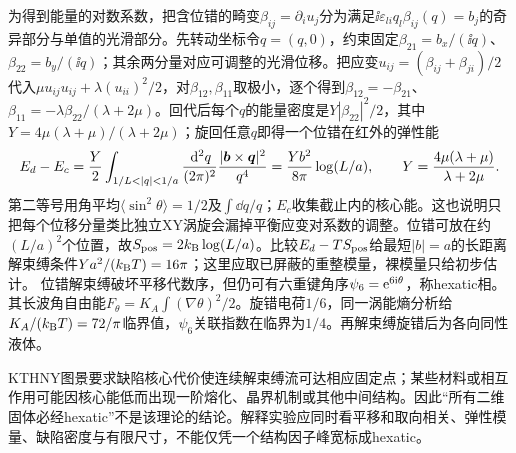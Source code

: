 为得到能量的对数系数，把含位错的畸变$\beta_{ij}=\partial_i u_j$分为满足$\ii\varepsilon_{li}q_l\beta_{ij}(q)=b_j$的奇异部分与单值的光滑部分。先转动坐标令$q=(q,0)$，约束固定$\beta_{21}=b_x/(\ii q)$、$\beta_{22}=b_y/(\ii q)$；其余两分量对应可调整的光滑位移。把应变$u_{ij}=(\beta_{ij}+\beta_{ji})/2$代入$\mu u_{ij}u_{ij}+\lambda(u_{ii})^2/2$，对$\beta_{12},\beta_{11}$取极小，逐个得到$\beta_{12}=-\beta_{21}$、$\beta_{11}=-\lambda\beta_{22}/(\lambda+2\mu)$。回代后每个$q$的能量密度是$Y|\beta_{22}|^2/2$，其中$Y=4\mu(\lambda+\mu)/(\lambda+2\mu)$；旋回任意$q$即得一个位错在红外的弹性能
\begin{equation}
E_d-E_c=\frac Y2\int_{1/L<|q|<1/a}\frac{\dd^2q}{(2\pi)^2}
\frac{|\vct b\times\vct q|^2}{q^4}
=\frac{Yb^2}{8\pi}\log(L/a),\qquad
Y=\frac{4\mu(\lambda+\mu)}{\lambda+2\mu}.
\end{equation}
第二等号用角平均$\langle\sin^2\theta\rangle=1/2$及$\int\dd q/q$；$E_c$收集截止内的核心能。这也说明只把每个位移分量类比独立XY涡旋会漏掉平衡应变对系数的调整。位错可放在约$(L/a)^2$个位置，故$S_{\rm pos}=2k_{\mathrm B}\log(L/a)$。比较$E_d-TS_{\rm pos}$给最短$|b|=a$的长距离解束缚条件$Ya^2/(k_{\mathrm B} T)=16\pi$；这里应取已屏蔽的重整模量，裸模量只给初步估计。
位错解束缚破坏平移代数序，但仍可有六重键角序$\psi_6=\mathrm e^{6\mathrm i\theta}$，称hexatic相。其长波角自由能$F_\theta=K_A\int(\nabla\theta)^2/2$。旋错电荷$1/6$，同一涡能熵分析给$K_A/(k_{\mathrm B} T)=72/\pi$临界值，$\psi_6$关联指数在临界为$1/4$。再解束缚旋错后为各向同性液体。

KTHNY图景要求缺陷核心代价使连续解束缚流可达相应固定点；某些材料或相互作用可能因核心能低而出现一阶熔化、晶界机制或其他中间结构。因此“所有二维固体必经hexatic”不是该理论的结论。解释实验应同时看平移和取向相关、弹性模量、缺陷密度与有限尺寸，不能仅凭一个结构因子峰宽标成hexatic。
